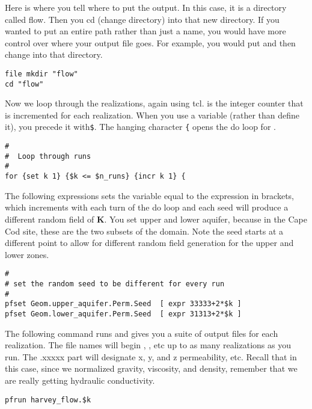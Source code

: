 Here is where you tell \parflow{} where to put the output.  
In this case, it is a directory called flow.  
Then you cd (change directory) into that new directory.  
If you wanted to put an entire path rather than just a name, 
you would have more control over where your output file goes.  
For example, you would put  
and then change into that directory. 

\begin{verbatim}
file mkdir "flow"
cd "flow"
\end{verbatim}

Now we loop through the realizations, again using tcl.   is the
integer counter that is incremented for each realization.  When you use a variable
(rather than define it), you precede it with\verb+$+.  The hanging character \verb+{+ 
opens the do loop for .

\begin{verbatim}
#
#  Loop through runs
#
for {set k 1} {$k <= $n_runs} {incr k 1} {
\end{verbatim}

The following expressions sets the variable  equal to the expression in brackets,
which increments with each turn of the do loop and each seed will produce a different random field of {\bf K}.  
You set upper and lower aquifer, because in the Cape Cod site, these are the two subsets of the domain. 
Note the seed starts at a different point to allow for different random field generation for the upper 
and lower zones.

\begin{verbatim}
#
# set the random seed to be different for every run
#
pfset Geom.upper_aquifer.Perm.Seed  [ expr 33333+2*$k ] 
pfset Geom.lower_aquifer.Perm.Seed  [ expr 31313+2*$k ]
\end{verbatim}

The following command runs \parflow{} and gives you a suite of output files for each realization.  
The file names will begin , , etc up to as many realizations as you run.  
The .xxxxx part will designate x, y, and z permeability, etc. Recall that in this case, since we normalized gravity, viscosity, 
and density, remember that we are really getting hydraulic conductivity.

\begin{verbatim}
pfrun harvey_flow.$k
\end{verbatim}

